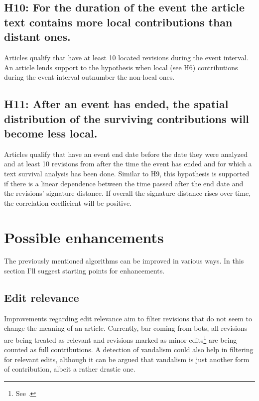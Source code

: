 
\subsection*{H10: For the duration of the event the article text contains more local contributions than distant ones.}

Articles qualify that have at least 10 located revisions during the event interval.
An article lends support to the hypothesis when local (see H6) contributions during the event interval outnumber the non-local ones.

\subsection*{H11: After an event has ended, the spatial distribution of the surviving contributions will become less local.}

Articles qualify that have an event end date before the date they were analyzed and at least 10 revisions from after the time the event has ended and for which a text survival analysis has been done.
Similar to H9, this hypothesis is supported if there is a linear dependence between the time passed after the end date and the revisions' signature distance.
If overall the signature distance rises over time, the correlation coefficient will be positive.


\section{Possible enhancements}

The previously mentioned algorithms can be improved in various ways.
In this section I'll suggest starting points for enhancements.

\subsection{Edit relevance}

Improvements regarding edit relevance aim to filter revisions that do not seem to change the meaning of an article.
Currently, bar coming from bots, all revisions are being treated as relevant and revisions marked as minor edits\footnote{See .} are being counted as full contributions.
A detection of vandalism could also help in filtering for relevant edits, although it can be argued that vandalism is just another form of contribution, albeit a rather drastic one.

